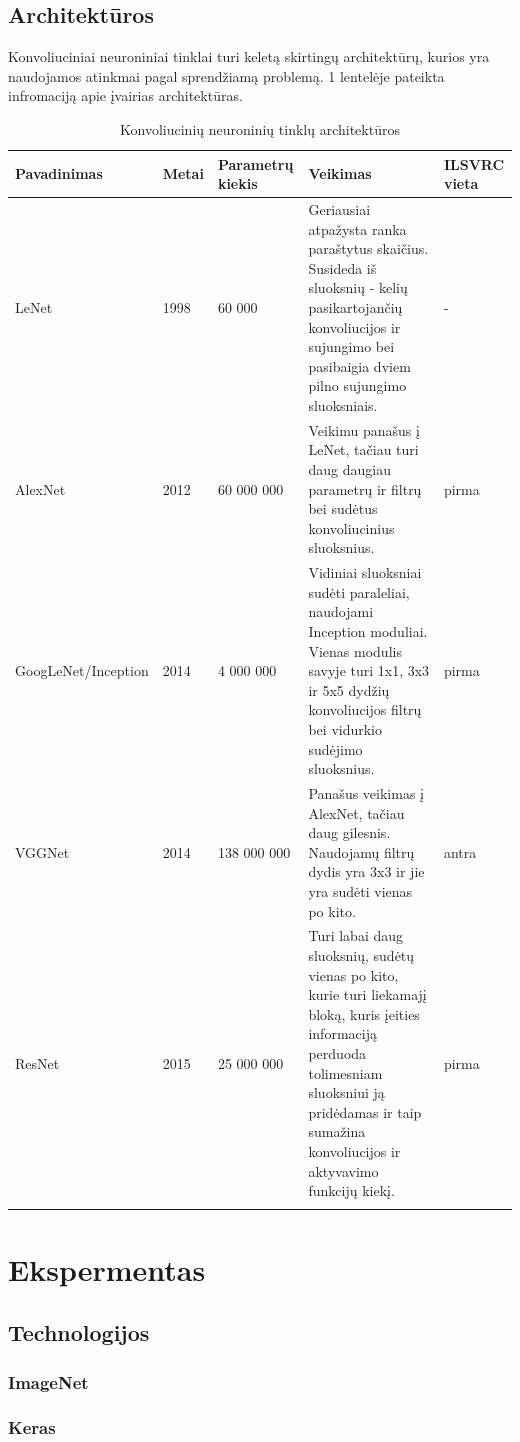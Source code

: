 \documentclass{VUMIFPSkursinis}
\begin{document}
\subsection{Architektūros}
Konvoliuciniai neuroniniai tinklai turi keletą skirtingų architektūrų, kurios yra naudojamos atinkmai pagal sprendžiamą problemą. 1 lentelėje pateikta infromaciją 
apie įvairias architektūras.


\begin{longtable}[h!]{ | p{4cm} | p{1cm} | p{3cm} | p{5cm} | p{2cm} | } 
\hline
Pavadinimas & Metai & Parametrų kiekis & Veikimas & ILSVRC vieta \\
\hline
LeNet & 1998 & 60 000 & Geriausiai atpažysta ranka paraštytus skaičius. Susideda iš sluoksnių - kelių pasikartojančių konvoliucijos ir sujungimo bei pasibaigia dviem pilno sujungimo sluoksniais. & - \\
\hline
AlexNet & 2012 & 60 000 000 & Veikimu panašus į LeNet, tačiau turi daug daugiau parametrų ir filtrų bei sudėtus konvoliucinius sluoksnius.  & pirma \\
\hline
GoogLeNet/Inception & 2014 & 4 000 000 & Vidiniai sluoksniai sudėti paraleliai, naudojami Inception moduliai. Vienas modulis savyje turi 1x1, 3x3 ir 5x5 dydžių konvoliucijos filtrų bei vidurkio sudėjimo sluoksnius. & pirma \\
\hline
VGGNet & 2014 & 138 000 000 & Panašus veikimas į AlexNet, tačiau daug gilesnis. Naudojamų filtrų dydis yra 3x3 ir jie yra sudėti vienas po kito. & antra \\
\hline
ResNet & 2015 & 25 000 000 & Turi labai daug sluoksnių, sudėtų vienas po kito, kurie turi liekamajį bloką, kuris įeities informaciją perduoda tolimesniam sluoksniui ją pridėdamas ir taip sumažina konvoliucijos ir aktyvavimo funkcijų kiekį.  & pirma \\
\hline
\caption{Konvoliucinių neuroninių tinklų architektūros}
\end{longtable}

\section{Ekspermentas}
\subsection{Technologijos}
\subsubsection{ImageNet}
\subsubsection{Keras}
\end{document}
